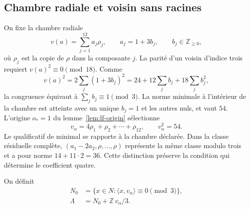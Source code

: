 \subsection{Chambre radiale et voisin sans racines}
\label{subsec:lf-neighbour}

On fixe la chambre radiale
\[
 v(a)=\sum_{j=1}^{12}a_j\rho_j,\qquad
 a_j=1+3b_j,\qquad b_j\in\mathbb Z_{\geq0},
\]
où \(\rho_j\) est la copie de \(\rho\) dans la composante \(j\). La parité d'un voisin d'indice trois requiert \(v(a)^2\equiv0\pmod{18}\). Comme
\[
 v(a)^2=2\sum_j(1+3b_j)^2
       =24+12\sum_jb_j+18\sum_jb_j^2,
\]
la congruence équivaut à \(\sum_jb_j\equiv1\pmod3\).
La norme minimale à l’intérieur de la chambre est atteinte avec
un unique \(b_j=1\) et les autres nuls, et vaut \(54\).
L’origine \(o_*=1\) du lemme~\ref{lem:lf-origin}
sélectionne
\begin{equation}
 v_\alpha=4\rho_1+\rho_2+\cdots+\rho_{12},
 \qquad v_\alpha^2=54.
 \label{eq:lf-valpha}
\end{equation}
Le qualificatif de minimal se rapporte à la chambre déclarée. Dans la classe résiduelle complète, \((a_1-2a_2,\rho,\ldots,\rho)\) représente la même classe modulo trois et a pour norme \(14+11\cdot2=36\). Cette distinction préserve la condition qui détermine le coefficient quatre.

On définit
\begin{equation}
\begin{split}
 N_0&=\{x\in N:\langle x,v_\alpha\rangle\equiv0\pmod3\},\\
 \Lambda&=N_0+\mathbb Z\,v_\alpha/3.
\end{split}
\label{eq:lf-lambda}
\end{equation}

